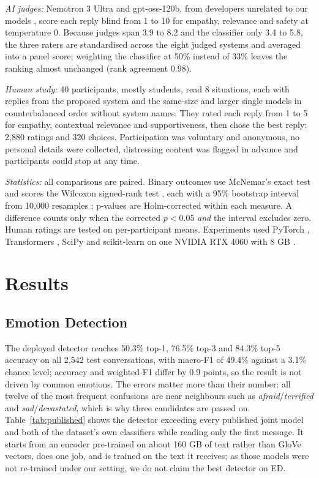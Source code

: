 \documentclass[conference]{IEEEtran}
\begin{document}
\textit{AI judges:} Nemotron 3 Ultra and gpt-oss-120b, from developers unrelated to our models \cite{b33}, score each reply blind from 1 to 10 for empathy, relevance and safety at temperature 0. Because judges span 3.9 to 8.2 and the classifier only 3.4 to 5.8, the three raters are standardised across the eight judged systems and averaged into a panel score; weighting the classifier at 50\% instead of 33\% leaves the ranking almost unchanged (rank agreement 0.98).

\textit{Human study:} 40 participants, mostly students, read 8 situations, each with replies from the proposed system and the same-size and larger single models in counterbalanced order without system names. They rated each reply from 1 to 5 for empathy, contextual relevance and supportiveness, then chose the best reply: 2,880 ratings and 320 choices. Participation was voluntary and anonymous, no personal details were collected, distressing content was flagged in advance and participants could stop at any time.

\textit{Statistics:} all comparisons are paired. Binary outcomes use McNemar's exact test \cite{b49} and scores the Wilcoxon signed-rank test \cite{b50}, each with a 95\% bootstrap interval from 10,000 resamples \cite{b51}; p-values are Holm-corrected \cite{b52} within each measure. A difference counts only when the corrected $p<0.05$ \textit{and} the interval excludes zero. Human ratings are tested on per-participant means. Experiments used PyTorch \cite{b53}, Transformers \cite{b54}, SciPy \cite{b55} and scikit-learn \cite{b56} on one NVIDIA RTX 4060 with 8 GB \cite{b57}.

\section{Results}\label{sec:results}

\subsection{Emotion Detection}
The deployed detector reaches 50.3\% top-1, 76.5\% top-3 and 84.3\% top-5 accuracy on all 2,542 test conversations, with macro-F1 of 49.4\% against a 3.1\% chance level; accuracy and weighted-F1 differ by 0.9 points, so the result is not driven by common emotions. The errors matter more than their number: all twelve of the most frequent confusions are near neighbours such as \textit{afraid}/\textit{terrified} and \textit{sad}/\textit{devastated}, which is why three candidates are passed on. Table~\ref{tab:published} shows the detector exceeding every published joint model and both of the dataset's own classifiers while reading only the first message. It starts from an encoder pre-trained on about 160 GB of text rather than GloVe vectors, does one job, and is trained on the text it receives; as those models were not re-trained under our setting, we do not claim the best detector on ED.
\end{document}
